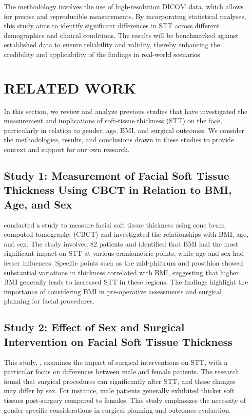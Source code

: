 \documentclass{article_saj}
\begin{document}
The methodology involves the use of high-resolution DICOM data, which allows for precise and reproducible measurements. By incorporating statistical analyses, this study aims to identify significant differences in STT across different demographics and clinical conditions. The results will be benchmarked against established data to ensure reliability and validity, thereby enhancing the credibility and applicability of the findings in real-world scenarios.


\section{RELATED WORK}

In this section, we review and analyze previous studies that have investigated the measurement and implications of soft-tissue thickness (STT) on the face, particularly in relation to gender, age, BMI, and surgical outcomes. We consider the methodologies, results, and conclusions drawn in these studies to provide context and support for our own research.

\subsection{Study 1: Measurement of Facial Soft Tissue Thickness Using CBCT in Relation to BMI, Age, and Sex}

\cite{b1} conducted a study to measure facial soft tissue thickness using cone beam computed tomography (CBCT) and investigated the relationships with BMI, age, and sex. The study involved 82 patients and identified that BMI had the most significant impact on STT at various craniometric points, while age and sex had lesser influences. Specific points such as the mid-philtrum and prosthion showed substantial variations in thickness correlated with BMI, suggesting that higher BMI generally leads to increased STT in these regions. The findings highlight the importance of considering BMI in pre-operative assessments and surgical planning for facial procedures.

\subsection{Study 2: Effect of Sex and Surgical Intervention on Facial Soft Tissue Thickness}

This study, \cite{b2}, examines the impact of surgical interventions on STT, with a particular focus on differences between male and female patients. The research found that surgical procedures can significantly alter STT, and these changes may differ by sex. For instance, male patients generally exhibited thicker soft tissues post-surgery compared to females. This study emphasizes the necessity of gender-specific considerations in surgical planning and outcomes evaluation.
\end{document}
